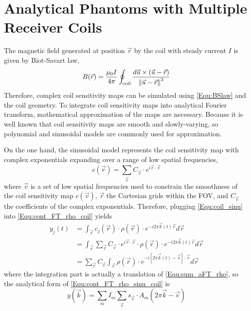 \chapter{Analytical Phantoms with Multiple Receiver Coils}
\label{Chp:AnalCoil}

The magnetic field generated at position $\vec{r}$ by the coil with steady current $I$ is given by Biot-Savart law,
\begin{equation} \label{Equ:BSlaw}
  B(\vec{r}) = \frac{\mu_0 I}{4\pi} \oint_{\text{coil}} \frac{d\vec{u} \times (\vec{u} - \vec{r})}{\left\lVert\vec{u}-\vec{r}\right\rVert^3}
\end{equation}
Therefore, complex coil sensitivity maps can be simulated using \cref{Equ:BSlaw} and the coil geometry. To integrate coil sensitivity maps into analytical Fourier transform, mathematical approximation of the maps are necessary. Because it is well known that coil sensitivity maps are smooth and slowly-varying, so polynomial and sinusoidal models \cite{1999_SENSE,2012_analSim} are commonly used for approximation. 

On the one hand, the sinusoidal model represents the coil sensitivity map with complex exponentials expanding over a range of low spatial frequencies,
\begin{equation} \label{Equ:coil_sinu}
  c(\vec{r}) = \sum_{\vec{v}} C_{\vec{v}} \cdot e^{i \vec{r} \cdot \vec{v}}
\end{equation}
where $\vec{v}$ is a set of low spatial frequencies used to constrain the smoothness of the coil sensitivity map $c(\vec{v})$, $\vec{r}$ the Cartesian grids within the FOV, and $C_{\vec{v}}$ the coefficients of the complex exponentials. Therefore, plugging \cref{Equ:coil_sinu} into \cref{Equ:cont_FT_rho_coil} yields 
\begin{equation} \label{Equ:cont_FT_rho_sinu_coil}
\begin{aligned}
  y_j(t) 
  & = \int_{\vec{r}} c_j(\vec{r}) \cdot \rho(\vec{r}) \cdot e^{-i 2\pi \vec{k}(t) \vec{r}} d\vec{r} \\
  & = \int_{\vec{r}} \sum_{\vec{v}} C_{\vec{v}} \cdot e^{i \vec{r} \cdot \vec{v}} \cdot \rho(\vec{r}) \cdot e^{-i 2\pi \vec{k}(t) \vec{r}} d\vec{r} \\
  & = \sum_{\vec{v}} C_{\vec{v}} \int_{\vec{r}} \rho(\vec{r}) \cdot e^{-i [2\pi \vec{k}(t) - \vec{v}] \cdot \vec{r}} d\vec{r}
\end{aligned}
\end{equation}
where the integration part is actually a translation of \cref{Equ:sum_aFT_rho}, so the analytical form of \cref{Equ:cont_FT_rho_sinu_coil} is
\begin{equation} \label{Equ:sum_aFT_rho_coil}
  y(\vec{k}) = \sum_{m} I_m \sum_{\vec{v}} s_{\vec{v}} \cdot A_m(2\pi \vec{k} - \vec{v})
\end{equation}

